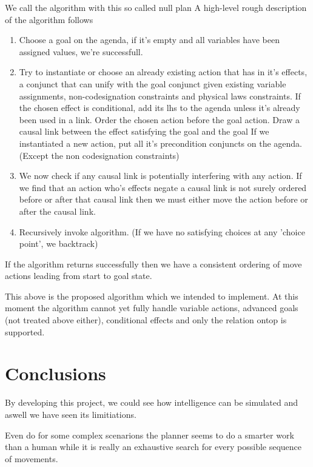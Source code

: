 \documentclass[11pt]{article}
\begin{document}
We call the algorithm with this so called null plan
A high-level rough description of the algorithm follows
\begin{enumerate}
\item 
  Choose a goal on the agenda, if it's empty and all variables have been
  assigned values, we're successfull.
\item 
  Try to instantiate or choose an already existing action that has in it's
  effects, a conjunct that can unify with the goal conjunct given existing
  variable assignments, non-codesignation constraints and physical laws
  constraints.  If the chosen effect is conditional, add its lhs to the agenda
  unless it's already been used in a link.  Order the chosen action before the
  goal action.  Draw a causal link between the effect satisfying the goal and
  the goal If we instantiated a new action, put all it's precondition conjuncts
  on the agenda.  (Except the non codesignation constraints)  
\item
  We now check if any causal link is potentially interfering with any action.
  If we find that an action who's effects negate a causal link is not surely
  ordered before or after that causal link then we must either move the action
  before or after the causal link. 
\item
  Recursively invoke algorithm. (If we have no satisfying choices at any 
  'choice point', we backtrack)
\end{enumerate}

If the algorithm returns successfully then we have a consistent ordering of move
actions leading from start to goal state.

This above is the proposed algorithm which we intended to implement.  At this
moment the algorithm cannot yet fully handle variable actions, advanced goals
(not treated above either), conditional effects and only the relation ontop is
supported. 
    
\section{Conclusions}
By developing this project, we could see how intelligence can be simulated and 
aswell we have seen its limitiations.  

Even do for some complex scenarions the planner seems to do a smarter work 
than a human while it is really an exhaustive search for every possible sequence 
of movements.  
\end{document}
